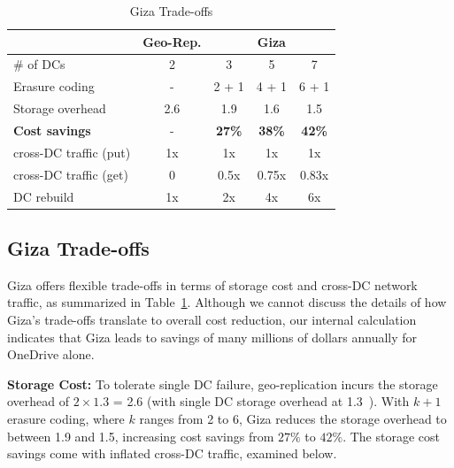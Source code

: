 \begin{table}[tp]
\centering
\footnotesize
\begin{tabular}{|l||c||c|c|c|}
\hline
											& Geo-Rep.						& \multicolumn{3}{c|}{Giza}
\\ \hline \hline
\# of DCs 						& 2										& 3 		& 5 		& 7
\\ \hline
Erasure coding 				& -										& 2 + 1	& 4 + 1	& 6 + 1
\\ \hline \hline
Storage overhead			& 2.6									& 1.9 	& 1.6 	& 1.5
\\ \hline
{\bf Cost savings}		& -										& {\bf 27\%} 	& {\bf 38\%} 	& {\bf 42\%}
\\ \hline \hline
cross-DC traffic (put)& 1x									& 1x 		& 1x 		& 1x
\\ \hline
cross-DC traffic (get)& 0										& 0.5x 	& 0.75x & 0.83x
\\ \hline
DC rebuild 						& 1x									& 2x 		& 4x 		& 6x
\\ \hline \hline
\end{tabular}
\caption{Giza Trade-offs}
\label{tab:cost_benefit}
\end{table}


\subsection{Giza Trade-offs}
\label{sec:alternative}

Giza offers flexible trade-offs in terms of storage cost and cross-DC network traffic,
as summarized in Table~\ref{tab:cost_benefit}.
Although we cannot discuss the details of how Giza's trade-offs translate to overall cost
reduction, our internal calculation indicates that Giza leads to savings of
many millions of dollars annually for OneDrive alone.

{\bf Storage Cost:} To tolerate single DC failure, geo-replication incurs the
storage overhead of $2\times1.3$ = 2.6 (with single DC storage overhead at 1.3~\cite{huang12erasure}).
With $k+1$ erasure coding, where $k$ ranges from 2 to 6, Giza reduces the
storage overhead to between 1.9 and 1.5, increasing cost savings from $27\%$ to
$42\%$. The storage cost savings come with inflated cross-DC traffic, examined
below.

